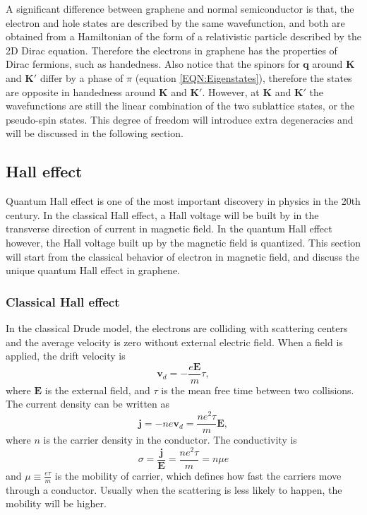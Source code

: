 \documentclass[pdflatex, sectionletters, 12pt]{pittetd}    %
\begin{document}
A significant difference between graphene and normal semiconductor is that, the electron and hole states are described by the same wavefunction, and both are obtained from a Hamiltonian of the form of a relativistic particle described by the 2D Dirac equation\cite{neto2009electronic}. Therefore the electrons in graphene has the properties of Dirac fermions, such as handedness. Also notice that the spinors for $\mathbf{q}$ around $\mathbf{K}$ and $\mathbf{K'}$ differ by a phase of $\pi$ (equation \ref{EQN:Eigenstates}), therefore the states are opposite in handedness around $\mathbf{K}$ and $\mathbf{K'}$. However, at $\mathbf{K}$ and $\mathbf{K'}$ the wavefunctions are still the linear combination of the two sublattice states, or the pseudo-spin states. This degree of freedom will introduce extra degeneracies and will be discussed in the following section.

\subsection{Hall effect}

Quantum Hall effect is one of the most important discovery in physics in the 20th century. In the classical Hall effect, a Hall voltage will be built by in the transverse direction of current in magnetic field. In the quantum Hall effect however, the Hall voltage built up by the magnetic field is quantized. This section will start from the classical behavior of electron in magnetic field, and discuss the unique quantum Hall effect in graphene.

\subsubsection{Classical Hall effect}

In the classical Drude model, the electrons are colliding with scattering centers and the average velocity is zero without external electric field. When a field is applied, the drift velocity is 
\begin{equation}
\mathbf{v}_d = -\frac{e\mathbf{E}}{m}\tau,
\label{EQN:ClassicalE}
\end{equation}
where $\mathbf{E}$ is the external field, and $\tau$ is the mean free time between two collisions. The current density can be written as 
$$\mathbf{j} = -ne\mathbf{v}_d = \frac{ne^2\tau}{m}\mathbf{E},$$
where $n$ is the carrier density in the conductor. The conductivity is 
\begin{equation}
\sigma = \frac{\mathbf{j}}{\mathbf{E}} = \frac{ne^2\tau}{m} = n\mu e
\label{EQN:Conductivity}
\end{equation}
and $\displaystyle \mu \equiv \frac{e\tau}{m}$ is the mobility of carrier, which defines how fast the carriers move through a conductor. Usually when the scattering is less likely to happen, the mobility will be higher.
\end{document}
